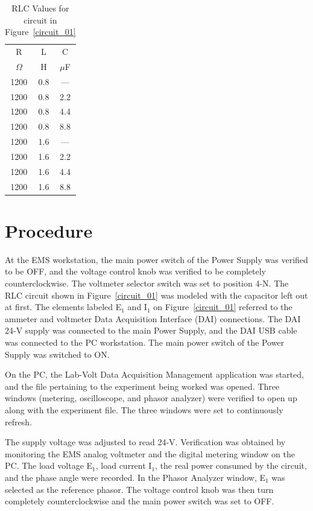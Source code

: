 \documentclass{article}
\begin{document}
\begin{table}[h]
  \begin{center}
    \begin{tabular}{ccc}
      \hline
      R & L & C \\
      $\Omega$ & H & $\mu$F \\
      \hline
      1200 & 0.8 & --- \\ 1200 & 0.8 & 2.2 \\ 1200 & 0.8 & 4.4 \\
      1200 & 0.8 & 8.8 \\ 1200 & 1.6 & --- \\ 1200 & 1.6 & 2.2 \\
      1200 & 1.6 & 4.4 \\ 1200 & 1.6 & 8.8 \\
      \hline
    \end{tabular}
    \caption{RLC Values for circuit in Figure~\ref{circuit_01}}
    \label{testc_dat}
  \end{center}
\end{table}

\section{Procedure}
At the EMS workstation, the main power switch of the Power Supply was verified
to be OFF, and the voltage control knob was verified to be completely
counterclockwise. The voltmeter selector switch was set to position 4-N. The
RLC circuit shown in Figure~\ref{circuit_01} was modeled with the capacitor
left out at first. The elements labeled E$_1$ and I$_1$ on
Figure~\ref{circuit_01} referred to the ammeter and voltmeter Data Acquisition
Interface (DAI) connections. The DAI 24-V supply was connected to the main
Power Supply, and the DAI USB cable was connected to the PC workstation. The
main power switch of the Power Supply was switched to ON.

On the PC, the Lab-Volt Data Acquisition Management application was started,
and the file pertaining to the experiment being worked was opened. Three
windows (metering, oscilloscope, and phasor analyzer) were verified to open up
along with the experiment file. The three windows were set to continuously
refresh.

The supply voltage was adjusted to read 24-V. Verification was obtained by
monitoring the EMS analog voltmeter and the digital metering window on the PC.
The load voltage E$_1$, load current I$_1$, the real power consumed by the
circuit, and the phase angle were recorded. In the Phasor Analyzer window,
E$_1$ was selected as the reference phasor. The voltage control knob was then
turn completely counterclockwise and the main power switch was set to OFF.
\end{document}

